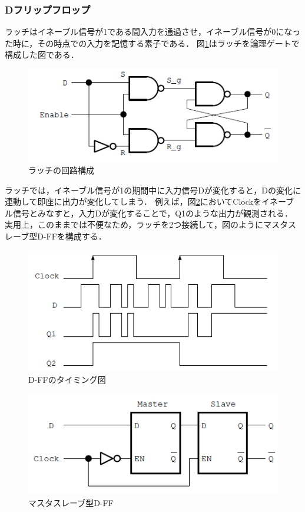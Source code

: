 \documentclass{jlreq}
\numberwithin{equation}{section}
\begin{document}
\subsubsection{Dフリップフロップ}
ラッチはイネーブル信号が1である間入力を通過させ，イネーブル信号が0になった時に，その時点での入力を記憶する素子である．
図\ref{fig:latch}はラッチを論理ゲートで構成した図である．
\begin{figure}[H]
	\centering
	\includegraphics{assets/latch.png}
	\caption{ラッチの回路構成}
	\label{fig:latch}
\end{figure}

ラッチでは，イネーブル信号が1の期間中に入力信号Dが変化すると，Dの変化に連動して即座に出力が変化してしまう．
例えば，図\ref{fig:d-ff_timing}においてClockをイネーブル信号とみなすと，入力Dが変化することで，Q1のような出力が観測される．
実用上，このままでは不便なため，ラッチを2つ接続して，図のようにマスタスレーブ型D-FFを構成する．
\begin{figure}[H]
	\centering
	\includegraphics{assets/d_ff_timing.png}
	\caption{D-FFのタイミング図}
	\label{fig:d-ff_timing}
\end{figure}

\begin{figure}[H]
	\centering
	\includegraphics{assets/master_slave_d-ff.png}
	\caption{マスタスレーブ型D-FF}
	\label{fig:master_slave_d-ff}
\end{figure}
\end{document}
